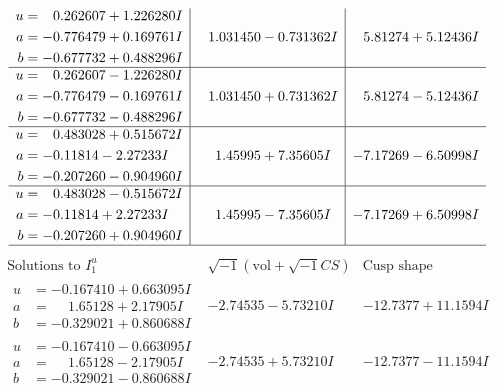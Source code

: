 \documentclass[1p]{elsarticle_modified}
\theoremstyle{definition}
\newcommand{\I}{\sqrt{-1}}
\begin{document}
$$\begin{array}{c|c|c}
\begin{aligned}
u &= \phantom{-}0.262607 + 1.226280 I \\
a &= -0.776479 + 0.169761 I \\
b &= -0.677732 + 0.488296 I\end{aligned}
 & \phantom{-}1.031450 - 0.731362 I & \phantom{-}5.81274 + 5.12436 I \\ \hline\begin{aligned}
u &= \phantom{-}0.262607 - 1.226280 I \\
a &= -0.776479 - 0.169761 I \\
b &= -0.677732 - 0.488296 I\end{aligned}
 & \phantom{-}1.031450 + 0.731362 I & \phantom{-}5.81274 - 5.12436 I \\ \hline\begin{aligned}
u &= \phantom{-}0.483028 + 0.515672 I \\
a &= -0.11814 - 2.27233 I \\
b &= -0.207260 - 0.904960 I\end{aligned}
 & \phantom{-}1.45995 + 7.35605 I & -7.17269 - 6.50998 I \\ \hline\begin{aligned}
u &= \phantom{-}0.483028 - 0.515672 I \\
a &= -0.11814 + 2.27233 I \\
b &= -0.207260 + 0.904960 I\end{aligned}
 & \phantom{-}1.45995 - 7.35605 I & -7.17269 + 6.50998 I\\
 \hline 
 \end{array}$$\newpage$$\begin{array}{c|c|c}  
\text{Solutions to }I^u_{1}& \I (\text{vol} + \sqrt{-1}CS) & \text{Cusp shape}\\
 \hline 
\begin{aligned}
u &= -0.167410 + 0.663095 I \\
a &= \phantom{-}1.65128 + 2.17905 I \\
b &= -0.329021 + 0.860688 I\end{aligned}
 & -2.74535 - 5.73210 I & -12.7377 + 11.1594 I \\ \hline\begin{aligned}
u &= -0.167410 - 0.663095 I \\
a &= \phantom{-}1.65128 - 2.17905 I \\
b &= -0.329021 - 0.860688 I\end{aligned}
 & -2.74535 + 5.73210 I & -12.7377 - 11.1594 I \\ \hline\begin{aligned}

\end{aligned}
\end{array}$$
\end{document}

